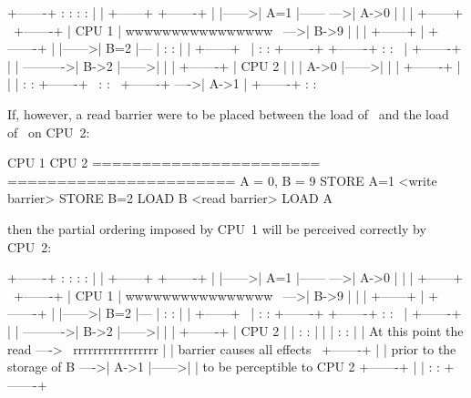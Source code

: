   \begin{VerbatimU}
	+-------+       :      :                :       :
	|       |       +------+                +-------+
	|       |------>| A=1  |------      --->| A->0  |
	|       |       +------+      \         +-------+
	| CPU 1 |   wwwwwwwwwwwwwwww   \    --->| B->9  |
	|       |       +------+        |       +-------+
	|       |------>| B=2  |---     |       :       :
	|       |       +------+   \    |       :       :       +-------+
	+-------+       :      :    \   |       +-------+       |       |
	                             ---------->| B->2  |------>|       |
	                                |       +-------+       | CPU 2 |
	                                |       | A->0  |------>|       |
	                                |       +-------+       |       |
	                                |       :       :       +-------+
	                                 \      :       :
	                                  \     +-------+
	                                   ---->| A->1  |
	                                        +-------+
	                                        :       :
\end{VerbatimU}

If, however, a read barrier were to be placed between the load of~ and the
load of~ on CPU~2:

\begin{VerbatimU}
	CPU 1                   CPU 2
	=======================	=======================
		{ A = 0, B = 9 }
	STORE A=1
	<write barrier>
	STORE B=2
	                        LOAD B
	                        <read barrier>
	                        LOAD A
\end{VerbatimU}

then the partial ordering imposed by CPU~1 will be perceived correctly by
CPU~2:

\begin{VerbatimU}
	+-------+       :      :                :       :
	|       |       +------+                +-------+
	|       |------>| A=1  |------      --->| A->0  |
	|       |       +------+      \         +-------+
	| CPU 1 |   wwwwwwwwwwwwwwww   \    --->| B->9  |
	|       |       +------+        |       +-------+
	|       |------>| B=2  |---     |       :       :
	|       |       +------+   \    |       :       :       +-------+
	+-------+       :      :    \   |       +-------+       |       |
	                             ---------->| B->2  |------>|       |
	                                |       +-------+       | CPU 2 |
	                                |       :       :       |       |
	                                |       :       :       |       |
	  At this point the read ---->   \  rrrrrrrrrrrrrrrrr   |       |
	  barrier causes all effects      \     +-------+       |       |
	  prior to the storage of B        ---->| A->1  |------>|       |
	  to be perceptible to CPU 2            +-------+       |       |
	                                        :       :       +-------+
\end{VerbatimU}

